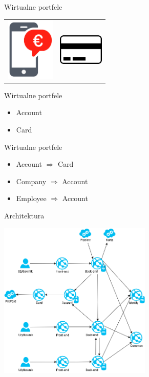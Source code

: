 \documentclass{beamer}
\begin{document}
\begin{frame}{Wirtualne portfele}
	\begin{center}
		\begin{tabular}{ c c }
  			\includegraphics[height=3cm]{wallet2.png} & \includegraphics[height=1.5cm]{prepaid1.png}
		\end{tabular}
	\end{center}
\end{frame}

\begin{frame}{Wirtualne portfele}
	\begin{huge}
		\begin{itemize}[<+->]
			\item Account
			\item Card
		\end{itemize}
	\end{huge}
\end{frame}

\begin{frame}{Wirtualne portfele}
	\begin{huge}
		\begin{itemize}[<+->]
			\item Account $\Rightarrow$ Card
			\item Company $\Rightarrow$ Account
			\item Employee $\Rightarrow$ Account
		\end{itemize}
	\end{huge}
\end{frame}

\begin{frame}{Architektura}
	\begin{center}
		\includegraphics[height=7.5cm]{architektura5.png}
	\end{center}
\end{frame}
\end{document}

